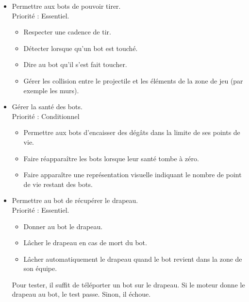 \documentclass[french]{article}
\begin{document}
\begin{itemize}
            
        \item Permettre aux bots de pouvoir tirer. \\
            Priorité : Essentiel.
            \begin{itemize}
                \item Respecter une cadence de tir.
                \item Détecter lorsque qu'un bot est touché.
                \item Dire au bot qu'il s'est fait toucher.
                \item Gérer les collision entre le projectile et les éléments de la zone de jeu (par exemple les murs).\\
            \end{itemize}

        \newpage
        \item Gérer la santé des bots.\\
            Priorité : Conditionnel
            \begin{itemize}
                \item Permettre aux bots d'encaisser des dégâts dans la limite de ses points de vie.
                \item Faire réapparaître les bots lorsque leur santé tombe à zéro.
                \item Faire apparaître une représentation visuelle indiquant le nombre de point de vie restant des bots.\\
            \end{itemize}
        

        \item Permettre au bot de récupérer le drapeau. \\
            Priorité : Essentiel.
            \begin{itemize}
                \item Donner au bot le drapeau.
                \item Lâcher le drapeau en cas de mort du bot.
                \item Lâcher automatiquement le drapeau quand le bot revient dans la zone de son équipe.\\
            \end{itemize}
            Pour tester, il suffit de téléporter un bot sur le drapeau. Si le moteur donne le drapeau au bot, le test passe. Sinon, il échoue.\\
        

\end{itemize}
\end{document}
